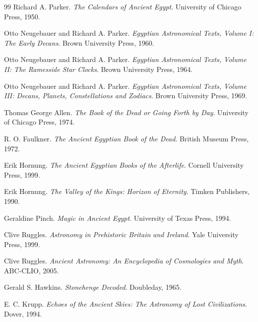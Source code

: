 \documentclass[11pt]{book}
\begin{document}
\begin{thebibliography}{99}
Richard A. Parker.
\newblock \emph{The Calendars of Ancient Egypt}.
\newblock University of Chicago Press, 1950.

Otto Neugebauer and Richard A. Parker.
\newblock \emph{Egyptian Astronomical Texts, Volume I: The Early Decans}.
\newblock Brown University Press, 1960.

Otto Neugebauer and Richard A. Parker.
\newblock \emph{Egyptian Astronomical Texts, Volume II: The Ramesside Star Clocks}.
\newblock Brown University Press, 1964.

Otto Neugebauer and Richard A. Parker.
\newblock \emph{Egyptian Astronomical Texts, Volume III: Decans, Planets, Constellations and Zodiacs}.
\newblock Brown University Press, 1969.

Thomas George Allen.
\newblock \emph{The Book of the Dead or Going Forth by Day}.
\newblock University of Chicago Press, 1974.

R. O. Faulkner.
\newblock \emph{The Ancient Egyptian Book of the Dead}.
\newblock British Museum Press, 1972.

Erik Hornung.
\newblock \emph{The Ancient Egyptian Books of the Afterlife}.
\newblock Cornell University Press, 1999.

Erik Hornung.
\newblock \emph{The Valley of the Kings: Horizon of Eternity}.
\newblock Timken Publishers, 1990.

Geraldine Pinch.
\newblock \emph{Magic in Ancient Egypt}.
\newblock University of Texas Press, 1994.

Clive Ruggles.
\newblock \emph{Astronomy in Prehistoric Britain and Ireland}.
\newblock Yale University Press, 1999.

Clive Ruggles.
\newblock \emph{Ancient Astronomy: An Encyclopedia of Cosmologies and Myth}.
\newblock ABC-CLIO, 2005.

Gerald S. Hawkins.
\newblock \emph{Stonehenge Decoded}.
\newblock Doubleday, 1965.

E. C. Krupp.
\newblock \emph{Echoes of the Ancient Skies: The Astronomy of Lost Civilizations}.
\newblock Dover, 1994.


\end{thebibliography}
\end{document}

